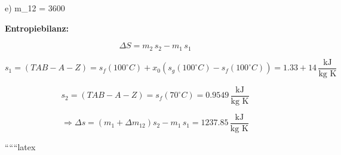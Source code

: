 e) \quad \Delta m_{12} = 3600 \, 

\textbf{Entropiebilanz:}

\[
\Delta S = m_2 \, s_2 - m_1 \, s_1
\]

\[
s_1 = (TAB - A - Z) = s_f(100^\circ C) + x_0 \left( s_g(100^\circ C) - s_f(100^\circ C) \right) = 1.33 + 14 \, \frac{\text{kJ}}{\text{kg K}}
\]

\[
s_2 = (TAB - A - Z) = s_f(70^\circ C) = 0.9549 \, \frac{\text{kJ}}{\text{kg K}}
\]

\[
\Rightarrow \Delta s = \left( m_1 + \Delta m_{12} \right) s_2 - m_1 \, s_1 = 1237.85 \, \frac{\text{kJ}}{\text{kg K}}
\]

``````latex